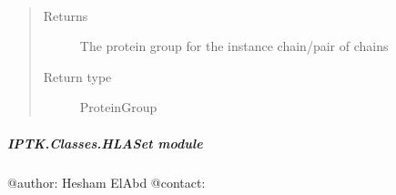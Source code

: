 \documentclass[letterpaper,10pt,english]{sphinxmanual}
\begin{document}
\begin{fulllineitems}
\begin{fulllineitems}
\end{fulllineitems}


\begin{fulllineitems}
\label{\detokenize{IPTK.Classes:IPTK.Classes.HLAMolecules.HLAMolecule.get_protein_group}}~\begin{quote}\begin{description}
\item[{Returns}] \leavevmode
The protein group for the instance chain/pair of chains

\item[{Return type}] \leavevmode
ProteinGroup

\end{description}\end{quote}

\end{fulllineitems}


\end{fulllineitems}



\subparagraph{IPTK.Classes.HLASet module}
\label{\detokenize{IPTK.Classes:module-IPTK.Classes.HLASet}}\label{\detokenize{IPTK.Classes:iptk-classes-hlaset-module}}
@author: Hesham ElAbd
@contact: 
\end{document}
